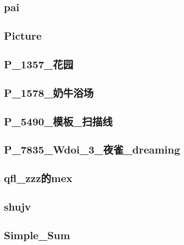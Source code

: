 \subsection{pai}
\raggedbottom
\hrulefill

\subsection{Picture}
\raggedbottom
\hrulefill

\subsection{P\_1357\_花园}
\raggedbottom
\hrulefill

\subsection{P\_1578\_奶牛浴场}
\raggedbottom
\hrulefill

\subsection{P\_5490\_模板\_扫描线}
\raggedbottom
\hrulefill

\subsection{P\_7835\_Wdoi\_3\_夜雀\_dreaming}
\raggedbottom
\hrulefill

\subsection{qfl\_zzz的mex}
\raggedbottom
\hrulefill

\subsection{shujv}
\raggedbottom
\hrulefill

\subsection{Simple\_Sum}
\raggedbottom
\hrulefill

